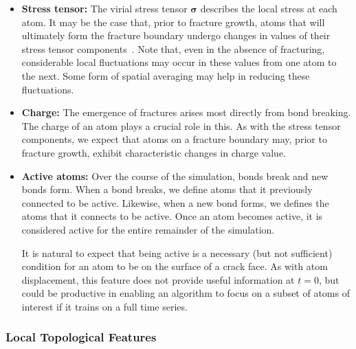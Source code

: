 \begin{itemize}
    \item\textbf{Stress tensor:} The virial stress tensor $\boldsymbol{\sigma}$ describes the local stress at each atom.  It may be the case that, prior to fracture growth, atoms that will ultimately form the fracture boundary undergo changes in values of their stress tensor components~\cite{elastic_fracture}. Note that, even in the absence of fracturing, considerable local fluctuations may occur in these values from one atom to the next.  Some form of spatial averaging may help in reducing these fluctuations.

    \item\textbf{Charge:} The emergence of fractures arises most directly from bond breaking.  The charge of an atom plays a crucial role in this.  As with the stress tensor components, we expect that atoms on a fracture boundary may, prior to fracture growth, exhibit characteristic changes in charge value.
    
    \item \textbf{Active atoms:} Over the course of the simulation, bonds break and new bonds form.  When a bond breaks, we define atoms that it previously connected to be active.  Likewise, when a new bond forms, we defines the atoms that it connects to be active.  Once an atom becomes active, it is considered active for the entire remainder of the simulation.
    
    It is natural to expect that being active is a necessary (but not sufficient) condition for an atom to be on the surface of a crack face.  As with atom displacement, this feature does not provide useful information at $t=0$, but could be productive in enabling an algorithm to focus on a subset of atoms of interest if it trains on a full time series.

\end{itemize}

\subsubsection{Local Topological Features}

